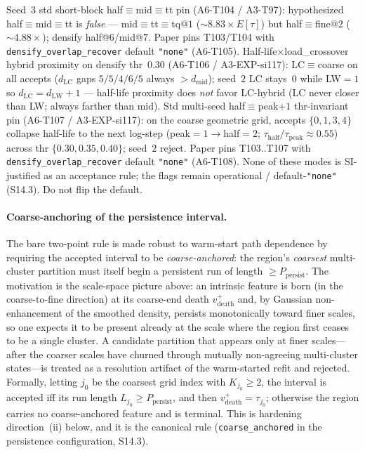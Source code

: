 \documentclass[11pt]{article}
\begin{document}
Seed~$3$ std short-block half$\equiv$mid$\equiv$tt pin (A6-T104 / A3-T97):
hypothesized half$\equiv$mid$\equiv$tt is \emph{false} --- mid$\equiv$tt$\equiv$tq@$1$
($\sim 8.83\times E[\tau]$) but half$\equiv$fine@$2$ ($\sim 4.88\times$);
densify half@$6$/mid@$7$. Paper pins T103/T104 with
\texttt{densify\_overlap\_recover} default \texttt{"none"} (A6-T105).
Half-life$\times$load\_crossover hybrid proximity on densify thr~$0.30$
(A6-T106 / A3-EXP-si117): LC$\equiv$coarse on all accepts
($d_{\mathrm{LC}}$ gaps $5/5/4/6/5$ always $>d_{\mathrm{mid}}$);
seed~$2$ LC stays~$0$ while LW${=}1$ so $d_{\mathrm{LC}}{=}d_{\mathrm{LW}}{+}1$ ---
half-life proximity does \emph{not} favor LC-hybrid (LC never closer than
LW; always farther than mid). Std multi-seed half$\equiv$peak${+}1$
thr-invariant pin (A6-T107 / A3-EXP-si117): on the coarse geometric grid,
accepts $\{0,1,3,4\}$ collapse half-life to the next log-step
(peak${=}1\to$half${=}2$; $\tau_{\mathrm{half}}/\tau_{\mathrm{peak}}\approx 0.55$)
across thr $\{0.30,0.35,0.40\}$; seed~$2$ reject. Paper pins
T103..T107 with \texttt{densify\_overlap\_recover} default \texttt{"none"}
(A6-T108).
None of these modes is SI-justified as an acceptance rule; the flags remain
operational / default-\texttt{"none"} (S14.3). Do not flip the default.

\paragraph{Coarse-anchoring of the persistence interval.} The bare two-point
rule is made robust to warm-start path dependence by requiring the accepted
interval to be \emph{coarse-anchored}: the region's \emph{coarsest} multi-cluster
partition must itself begin a persistent run of length $\ge P_{\mathrm{persist}}$.
The motivation is the scale-space picture above: an intrinsic feature is born (in
the coarse-to-fine direction) at its coarse-end death $v_{\mathrm{death}}^+$ and,
by Gaussian non-enhancement of the smoothed density, persists monotonically
toward finer scales, so one expects it to be present already at the scale where
the region first ceases to be a single cluster. A candidate partition that
appears only at finer scales---after the coarser scales have churned through
mutually non-agreeing multi-cluster states---is treated as a resolution artifact
of the warm-started refit and rejected. Formally, letting $j_0$ be the coarsest
grid index with $K_{j_0}\ge 2$, the interval is accepted iff its run length
$L_{j_0}\ge P_{\mathrm{persist}}$, and then $v_{\mathrm{death}}^+=\tau_{j_0}$;
otherwise the region carries no coarse-anchored feature and is terminal. This is
hardening direction~(ii) below, and it is the canonical rule
(\texttt{coarse\_anchored} in the persistence configuration, S14.3).
\end{document}

